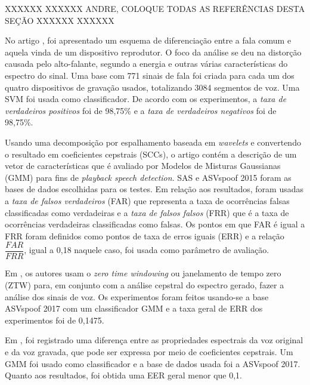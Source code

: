 	XXXXXX XXXXXX ANDRE, COLOQUE TODAS AS REFERÊNCIAS DESTA SEÇÃO XXXXXX XXXXXX
	
		\par No artigo \cite{Ren2019}, foi apresentado um esquema de diferenciação entre a fala comum e aquela vinda de um dispositivo reprodutor. O foco da análise se deu na distorção causada pelo alto-falante, segundo a energia e outras várias características do espectro do sinal. Uma base com 771 sinais de fala foi criada para cada um dos quatro dispositivos de gravação usados, totalizando 3084 segmentos de voz. Uma SVM foi usada como classificador. De acordo com os experimentos, a \textit{taxa de verdadeiros positivos} foi de 98,75\% e a \textit{taxa de verdadeiros negativos} foi de 98,75\%.
		
		\par Usando uma decomposição por espalhamento baseada em \textit{wavelets} e convertendo o resultado em coeficientes cepstrais (SCCs), o artigo \cite{7802552} contém a descrição de um vetor de características que é avaliado por Modelos de Misturas Gaussianas (GMM) para fins de \textit{playback speech detection}. SAS e ASVspoof 2015 \cite{ASVspoof2015} foram as bases de dados escolhidas para os testes. Em relação aos resultados, foram usadas a \textit{taxa de falsos verdadeiros} (FAR) que representa a taxa de ocorrências falsas classificadas como verdadeiras e a \textit{taxa de falsos falsos} (FRR) que é a taxa de ocorrências verdadeiras classificadas como falsas. Os pontos em que FAR é igual a FRR foram definidos como pontos de taxa de erros iguais (ERR) e a relação $\dfrac{FAR}{FRR}$, igual a 0,18 naquele caso, foi usada como parâmetro de avaliação.

		\par Em \cite{alluri2019replay}, os autores usam o \textit{zero time windowing} ou janelamento de tempo zero (ZTW) para, em conjunto com a análise cepstral do espectro gerado, fazer a análise dos sinais de voz. Os experimentos foram feitos usando-se a base ASVspoof 2017\cite{ASVspoof2017} com um classificador GMM e a taxa geral de ERR dos experimentos foi de 0,1475.
		
		\par Em \cite{8725688}, foi registrado uma diferença entre as propriedades espectrais da voz original e da voz gravada, que pode ser expressa por meio de coeficientes cepstrais. Um GMM foi usado como classificador e a base de dados usada foi a ASVspoof 2017. Quanto aos resultados, foi obtida uma EER geral menor que 0,1.
	
